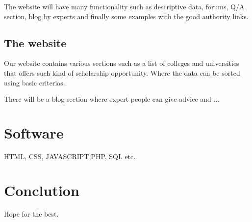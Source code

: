 \documentclass[a4paper,12pt]{report}
\begin{document}
The website will have many functionality such as descriptive data, forums, Q/A section, blog by experts and finally some examples with the good authority links.
\subsection*{The website}
Our website contains various sections such as a list of colleges and universities that offers such kind of scholarship opportunity. Where the data can be sorted using basic criterias.

There will be a blog section where expert people can give advice and ...



\section*{Software}
HTML, CSS, JAVASCRIPT,PHP, SQL etc.
\section*{Conclution}
Hope for the best.
\end{document}

